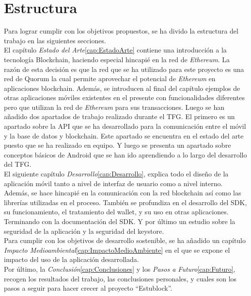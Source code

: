 \section{Estructura}
Para lograr cumplir con los objetivos propuestos, se ha divido la estructura del trabajo en las siguientes secciones. \\

El capítulo \emph{Estado del Arte}\ref{cap:EstadoArte} contiene una introducción a la tecnología Blockchain, haciendo especial hincapié en la red de \emph{Ethereum}\cite{webEthereum}. La razón de esta decisión es que la red que se ha utilizado para este proyecto es una red de Quorum\cite{webQuorum} la cual permite aprovechar el potencial de \emph{Ethereum} en aplicaciones blockchain. Además, se introducen al final del capítulo ejemplos de otras aplicaciones móviles existentes en el presente con funcionalidades diferentes pero que utilizan la red de \emph{Ethereum} para sus transacciones. Luego se han añadido dos apartados de trabajo realizado durante el TFG. El primero es un apartado sobre la API que se ha desarrollado para la comunicación entre el móvil y la base de datos y blockchain. Este apartado se encuentra en el estado del arte puesto que se ha realizado en equipo. Y luego se presenta un apartado sobre conceptos básicos de Android que se han ido aprendiendo a lo largo del desarrollo del TFG. \\

El siguiente capítulo \emph{Desarrollo}\ref{cap:Desarrollo}, explica todo el diseño de la aplicación móvil tanto a nivel de interfaz de usuario como a nivel interno. Además, se hace hincapié en la comunicación con la red blockchain así como las librerías utilizadas en el proceso. También se profundiza en el desarrollo del SDK, su funcionamiento, el tratamiento del wallet, y su uso en otras aplicaciones. Terminando con la documentación del SDK. Y por último un estudio sobre la seguridad de la aplicación y la seguridad del keystore. \\

Para cumplir con los objetivos de desarrollo sostenible, se ha añadido un capítulo \emph{Impacto Medioambiental}\ref{cap:ImpactoMedioAmbiente} en el que se expone el impacto del uso de la aplicación desarrollada. \\

Por último, la \emph{Conclusión}\ref{cap:Conclusiones} y los \emph{Pasos a Futuro}\ref{cap:Futuro}, recogen los resultados del trabajo, las conclusiones personales, y cuales son los pasos a seguir para hacer crecer al proyecto ``Estublock''.

